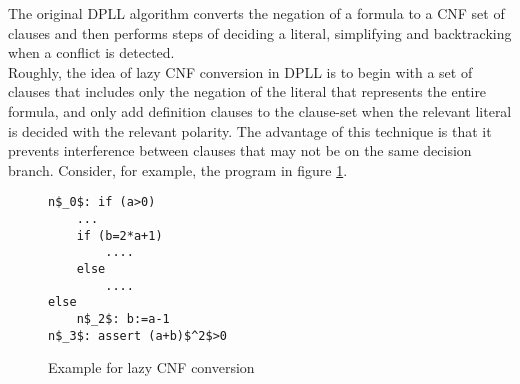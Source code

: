 The original DPLL algorithm converts the negation of a formula to a CNF set of clauses and then performs steps of deciding a literal, simplifying and backtracking when a conflict is detected.\\
Roughly, the idea of lazy CNF conversion in DPLL is to begin with a set of clauses that includes only the negation of the literal that represents the entire formula, and only add definition clauses to the clause-set when the relevant literal is decided with the relevant polarity. The advantage of this technique is that it prevents interference between clauses that may not be on the same decision branch.
Consider, for example, the program in figure \ref{snippet_1.3}.\\
\begin{figure}
\begin{lstlisting}
n$_0$: if (a>0)
	...
	if (b=2*a+1)
		....
	else
		....
else
	n$_2$: b:=a-1
n$_3$: assert (a+b)$^2$>0
\end{lstlisting}
\caption{Example for lazy CNF conversion}
\label{snippet_1.3}
\end{figure}

